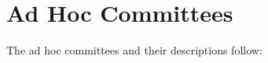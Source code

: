 \section{Ad Hoc Committees}\label{sec:AdHocCommittees} The ad hoc committees and their descriptions follow:\\







